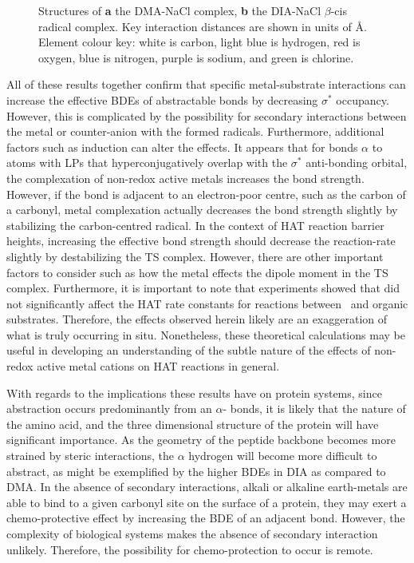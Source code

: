 \begin{doublespace}
\begin{figure}[!htbp]
  \caption[Structures of the DIA-NaCl complex and radical complex.]{Structures
  of \textbf{a} the DMA-NaCl complex, \textbf{b} the DIA-NaCl $\beta$-cis
  radical complex. Key interaction distances are shown in units of \AA. Element
  colour key: white is carbon, light blue is hydrogen, red is oxygen, blue is
  nitrogen, purple is sodium, and green is chlorine.} \label{fig:dia-na-cl}
\end{figure}

All of these results together confirm that specific metal-substrate interactions
can increase the effective BDEs of abstractable  bonds by decreasing
 $\sigma^*$ occupancy. However, this is complicated by the possibility
for secondary interactions between the metal or counter-anion with the formed
radicals. Furthermore, additional factors such as induction can alter the
effects. It appears that for  bonds $\alpha$ to atoms with LPs that
hyperconjugatively overlap with the  $\sigma^*$ anti-bonding orbital,
the complexation of non-redox active metals increases the  bond
strength. However, if the  bond is adjacent to an electron-poor centre,
such as the carbon of a carbonyl, metal complexation actually decreases the bond
strength slightly by stabilizing the carbon-centred radical. In the context of
HAT reaction barrier heights, increasing the effective  bond strength
should decrease the reaction-rate slightly by destabilizing the TS complex.
However, there are other important factors to consider such as how the metal
effects the dipole moment in the TS complex. Furthermore, it is important to
note that experiments showed that  did not significantly affect the
HAT rate constants for reactions between \cumo\ and organic substrates.
Therefore, the effects observed herein likely are an exaggeration of what is
truly occurring in situ. Nonetheless, these theoretical calculations may be
useful in developing an understanding of the subtle nature of the effects of
non-redox active metal cations on HAT reactions in general.

With regards to the implications these results have on protein systems, since
abstraction occurs predominantly from an $\alpha$- bonds, it is likely
that the nature of the amino acid, and the three dimensional structure of the
protein will have significant importance. As the geometry of the peptide
backbone becomes more strained by steric interactions, the $\alpha$ hydrogen
will become more difficult to abstract, as might be exemplified by the higher
 BDEs in DIA as compared to DMA. In the absence of secondary
interactions, alkali or alkaline earth-metals are able to bind to a given
carbonyl site on the surface of a protein, they may exert a chemo-protective
effect by increasing the BDE of an adjacent  bond. However, the
complexity of biological systems makes the absence of secondary interaction
unlikely. Therefore, the possibility for chemo-protection to occur is remote.


\end{doublespace}
